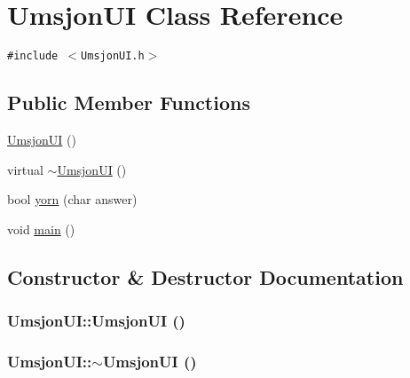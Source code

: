 \hypertarget{class_umsjon_u_i}{
\section{Umsjon\-UI Class Reference}
\label{class_umsjon_u_i}
}
{\tt \#include $<$Umsjon\-UI.h$>$}

\subsection*{Public Member Functions}
\begin{CompactItemize}
\item 
\hyperlink{class_umsjon_u_i_f327260d03ec6a1022392d59d31b1afb}{Umsjon\-UI} ()
\item 
virtual \hyperlink{class_umsjon_u_i_afbb13b128eef1970fc6e090ff07635e}{$\sim$Umsjon\-UI} ()
\item 
bool \hyperlink{class_umsjon_u_i_e1489f835e125c37fb30e595797d971d}{yorn} (char answer)
\item 
void \hyperlink{class_umsjon_u_i_ea83b916b3f52eec32ae6d54d59b4453}{main} ()
\end{CompactItemize}


\subsection{Constructor \& Destructor Documentation}
\hypertarget{class_umsjon_u_i_f327260d03ec6a1022392d59d31b1afb}{
\subsubsection[UmsjonUI]{\setlength{\rightskip}{0pt plus 5cm}Umsjon\-UI::Umsjon\-UI ()}}
\label{class_umsjon_u_i_f327260d03ec6a1022392d59d31b1afb}


\hypertarget{class_umsjon_u_i_afbb13b128eef1970fc6e090ff07635e}{
\subsubsection[$\sim$UmsjonUI]{\setlength{\rightskip}{0pt plus 5cm}Umsjon\-UI::$\sim$Umsjon\-UI ()}}
\label{class_umsjon_u_i_afbb13b128eef1970fc6e090ff07635e}




